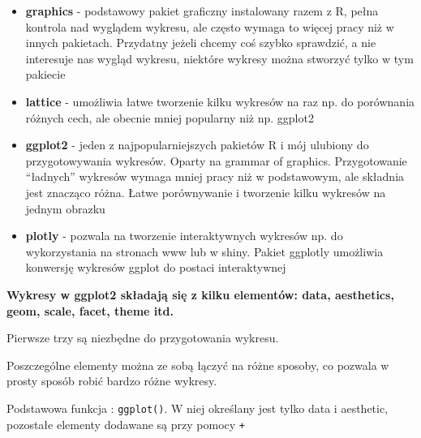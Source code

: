 \documentclass[
]{book}
\begin{document}
\begin{itemize}
\item
  \textbf{graphics} - podstawowy pakiet graficzny instalowany razem z R, pełna kontrola nad wyglądem wykresu, ale często wymaga to więcej pracy niż w innych pakietach. Przydatny jeżeli chcemy coś szybko sprawdzić, a nie interesuje nas wygląd wykresu, niektóre wykresy można stworzyć tylko w tym pakiecie
\item
  \textbf{lattice} - umożliwia łatwe tworzenie kilku wykresów na raz np. do porównania różnych cech, ale obecnie mniej popularny niż np. ggplot2
\item
  \textbf{ggplot2} - jeden z najpopularniejszych pakietów R i mój ulubiony do przygotowywania wykresów. Oparty na grammar of graphics. Przygotowanie ``ładnych'' wykresów wymaga mniej pracy niż w podstawowym, ale składnia jest znacząco różna. Łatwe porównywanie i tworzenie kilku wykresów na jednym obrazku
\item
  \textbf{plotly} - pozwala na tworzenie interaktywnych wykresów np. do wykorzystania na stronach www lub w shiny. Pakiet ggplotly umożliwia konwersję wykresów ggplot do postaci interaktywnej
\end{itemize}

\textbf{Wykresy w ggplot2 składają się z kilku elementów: data, aesthetics, geom, scale, facet, theme itd.}

Pierwsze trzy są niezbędne do przygotowania wykresu.

Poszczególne elementy można ze sobą łączyć na różne sposoby, co pozwala w prosty sposób robić bardzo różne wykresy.

Podstawowa funkcja : \texttt{ggplot()}. W niej określany jest tylko data i aesthetic, pozostałe elementy dodawane są przy pomocy \texttt{+}
\end{document}
